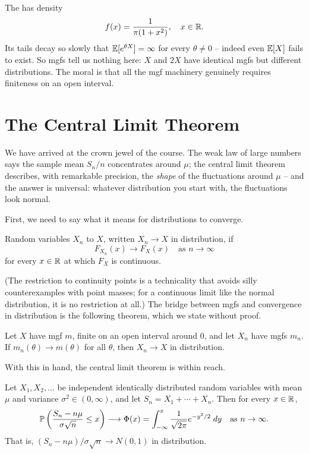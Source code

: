 \documentclass[a4paper]{scrartcl}
\begin{document}
\begin{example}
	The  has density
	$$
	f(x) = \frac{1}{\pi(1 + x^2)}, \quad x \in \mathbb{R}.
	$$
	Its tails decay so slowly that $\mathbb{E}[e^{\theta X}] = \infty$ for every $\theta \neq 0$ -- indeed even $\mathbb{E}[X]$ fails to exist. So mgfs tell us nothing here: $X$ and $2X$ have identical mgfs but different distributions. The moral is that all the mgf machinery genuinely requires finiteness on an open interval.
\end{example}

\section{The Central Limit Theorem}

We have arrived at the crown jewel of the course. The weak law of large numbers says the sample mean $S_n / n$ concentrates around $\mu$; the central limit theorem describes, with remarkable precision, the \emph{shape} of the fluctuations around $\mu$ -- and the answer is universal: whatever distribution you start with, the fluctuations look normal.

First, we need to say what it means for distributions to converge.

\begin{definition}
	Random variables $X_n$  to $X$, written $X_n \rightarrow X$ in distribution, if
	$$
	F_{X_n}(x) \longrightarrow F_X(x) \quad \text{as } n \rightarrow \infty
	$$
	for every $x \in \mathbb{R}$ at which $F_X$ is continuous.
\end{definition}

(The restriction to continuity points is a technicality that avoids silly counterexamples with point masses; for a continuous limit like the normal distribution, it is no restriction at all.) The bridge between mgfs and convergence in distribution is the following theorem, which we state without proof.

\begin{theorem}
	Let $X$ have mgf $m$, finite on an open interval around $0$, and let $X_n$ have mgfs $m_n$. If $m_n(\theta) \rightarrow m(\theta)$ for all $\theta$, then $X_n \rightarrow X$ in distribution.
\end{theorem}

With this in hand, the central limit theorem is within reach.

\begin{theorem}
	Let $X_1, X_2, \dots$ be independent identically distributed random variables with mean $\mu$ and variance $\sigma^2 \in (0, \infty)$, and let $S_n = X_1 + \cdots + X_n$. Then for every $x \in \mathbb{R}$,
	$$
	\mathbb{P}\left(\frac{S_n - n\mu}{\sigma\sqrt{n}} \leq x \right) \longrightarrow \Phi(x) = \int_{-\infty}^{x} \frac{1}{\sqrt{2\pi}}e^{-y^2/2}\; d y \quad \text{as } n \rightarrow \infty.
	$$
	That is, $(S_n - n\mu)/\sigma\sqrt{n} \rightarrow N(0,1)$ in distribution.
\end{theorem}
\end{document}
